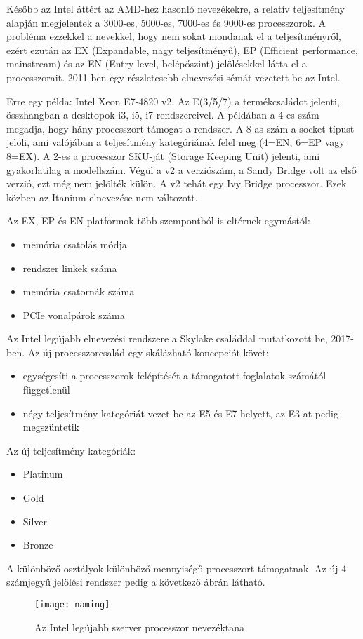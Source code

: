 Később az Intel áttért az AMD-hez hasonló nevezékekre, a relatív teljesítmény alapján megjelentek a 3000-es, 5000-es, 7000-es és 9000-es processzorok.
A probléma ezzekkel a nevekkel, hogy nem sokat mondanak el a teljesítményről, ezért ezután az EX (Expandable, nagy teljesítményű), EP (Efficient performance, mainstream) és az EN (Entry level, belépőszint) jelölésekkel látta el a processzorait.
2011-ben egy részletesebb elnevezési sémát vezetett be az Intel.

Erre egy példa: Intel Xeon E7-4820 v2.
Az E(3/5/7) a termékcsaládot jelenti, összhangban a desktopok i3, i5, i7 rendszereivel.
A példában a 4-es szám megadja, hogy hány processzort támogat a rendszer.
A 8-as szám a socket típust jelöli, ami valójában a teljesítmény kategóriának felel meg (4=EN, 6=EP vagy 8=EX).
A 2-es a processzor SKU-ját (Storage Keeping Unit) jelenti, ami gyakorlatilag a modellszám.
Végül a v2 a verziószám, a Sandy Bridge volt az első verzió, ezt még nem jelölték külön.
A v2 tehát egy Ivy Bridge processzor.
Ezek közben az Itanium elnevezése nem változott.

Az EX, EP és EN platformok több szempontból is eltérnek egymástól:
\begin{itemize}
    \item memória csatolás módja
    \item rendszer linkek száma
    \item memória csatornák száma
    \item PCIe vonalpárok száma
\end{itemize}

Az Intel legújabb elnevezési rendszere a Skylake családdal mutatkozott be, 2017-ben.
Az új processzorcsalád egy skálázható koncepciót követ:
\begin{itemize}
    \item egységesíti a processzorok felépítését a támogatott foglalatok számától függetlenül
    \item négy teljesítmény kategóriát vezet be az E5 és E7 helyett, az E3-at pedig megszüntetik
\end{itemize}
Az új teljesítmény kategóriák:
\begin{itemize}
    \item Platinum
    \item Gold
    \item Silver
    \item Bronze
\end{itemize}
A különböző osztályok különböző mennyiségű processzort támogatnak.
Az új 4 számjegyű jelölési rendszer pedig a következő ábrán látható.
\begin{figure}[H]
    \texttt{[image: naming]}
    \centering
    \caption{Az Intel legújabb szerver processzor nevezéktana}
    \label{fig:naming}
\end{figure}

